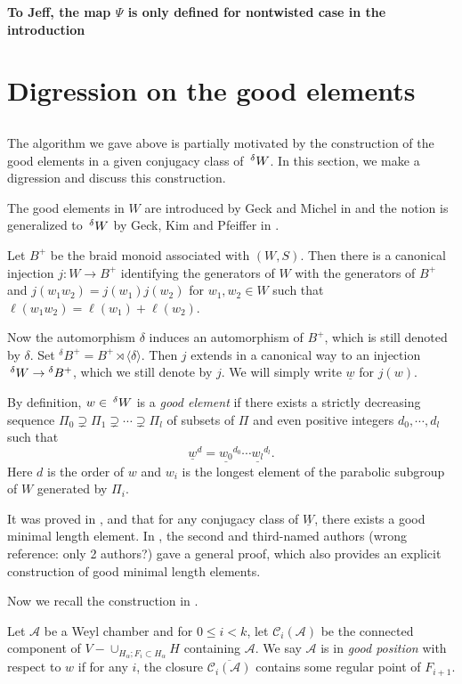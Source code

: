 \documentclass[12pt,leqno]{article}
\newcommand{\caC}{\mathcal C}
\newcommand{\caA}{\mathcal A}
\renewcommand{\a}{\mathfrak a}
\renewcommand{\sec}[1]{\section{#1}
\renewcommand{\theequation}{\thesection.\arabic{equation}}
  \setcounter{equation}{0}}
\newcommand{\Wext}{\negthinspace\negthinspace\phantom{a}^\delta W}
\def\le{\leqslant}
\def\a{\alpha}
\renewcommand{\sec}[1]{\section{#1}
\renewcommand{\theequation}{\thesection.\arabic{equation}}
  \setcounter{equation}{0}}
\begin{document}
{\bf To Jeff, the map $\Psi$ is only defined for nontwisted case in the introduction}

\sec{Digression on the good elements}

\subsection{} The algorithm we gave above is partially motivated by
the construction of the good elements in a given conjugacy class of
$\Wext$. In this section, we make a digression and discuss this
construction.

The good elements in $W$ are introduced by Geck and Michel in
\cite{geck_michel_good} and the notion is generalized to $\Wext$ by Geck, Kim and
Pfeiffer in \cite{gkp}.

Let $B^+$ be the braid monoid associated with $(W,S)$. Then there is a
canonical injection $j:W\longrightarrow B^+$ identifying the
generators of $W$ with the generators of $B^+$ and
$j(w_1w_2)=j(w_1)j(w_2)$ for $w_1,w_2\in W$ such that
$\ell(w_1w_2)=\ell(w_1)+\ell(w_2)$.

Now the automorphism $\delta$ induces an automorphism of $B^+$, which
is still denoted by $\delta$. Set ${}^{\delta} B^+=B^+ \rtimes
\langle\delta\rangle$. Then $j$ extends in a canonical way to an
injection $\Wext \to {}^{\delta} B^+$, which we still denote by
$j$. We will simply write $\underline w$ for $j(w)$.

By definition, $w \in \Wext$ is a {\it good element} if there exists a
strictly decreasing sequence $\Pi_0 \supsetneq \Pi_1 \supsetneq \cdots
\supsetneq \Pi_l$ of subsets of $\Pi$ and even positive integers
$d_0,\cdots,d_l$ such
that $${\underline{w}}^d=\underline{w_0}^{d_0}\cdots\underline{w_l}^{d_l}.$$
Here $d$ is the order of $w$ and $w_i$ is the longest element of the
parabolic subgroup of $W$ generated by $\Pi_i$.

It was proved in \cite{geck_michel_good}, \cite{gkp} and \cite{he_minimal_length_double_cosets} that for any
conjugacy class of $\underline W$, there exists a good minimal length
element. In \cite{he_nie_minimal_finite}, the second and third-named authors  
(wrong reference: only 2 authors?) gave a
general proof, which also provides an explicit construction of good
minimal length elements.

Now we recall the construction in \cite{he_nie_minimal_finite}.

Let $\caA$ be a Weyl chamber and for $0 \le i < k$, let $\caC_i(\caA)$
be the connected component of $V-\cup_{H_\a; F_i \subset H_\a}H$
containing $\caA$. We say $\caA$ is in {\it good position} with
respect to $w$ if for any $i$, the closure $\overline{\caC_i(\caA)}$
contains some regular point of $F_{i+1}$.
\end{document}
